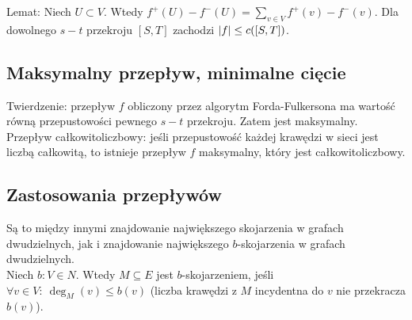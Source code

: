 Lemat: Niech $U \subset V$. Wtedy $f^+(U) - f^-(U) = 
\sum\limits_{v \in V} f^+(v) - f^-(v)$. Dla dowolnego $s-t$ przekroju $[S, T]$
zachodzi $\left| f \right| \leq c([S, T])$.

\subsection*{Maksymalny przepływ, minimalne cięcie}
Twierdzenie: przepływ $f$ obliczony przez algorytm Forda-Fulkersona ma wartość
równą przepustowości pewnego $s-t$ przekroju. Zatem jest maksymalny. \\

Przepływ całkowitoliczbowy: jeśli przepustowość każdej krawędzi w sieci jest liczbą
całkowitą, to istnieje przepływ $f$ maksymalny, który jest całkowitoliczbowy.

\subsection*{Zastosowania przepływów}
Są to między innymi znajdowanie największego skojarzenia w grafach dwudzielnych, jak
i znajdowanie największego $b$-skojarzenia w grafach dwudzielnych. \\

Niech $b: V \in N$. Wtedy $M \subseteq E$ jest $b$-skojarzeniem, jeśli
$\forall v \in V: \ \deg_M (v) \leq b(v)$ (liczba krawędzi z $M$ incydentna do $v$
nie przekracza $b(v)$).
